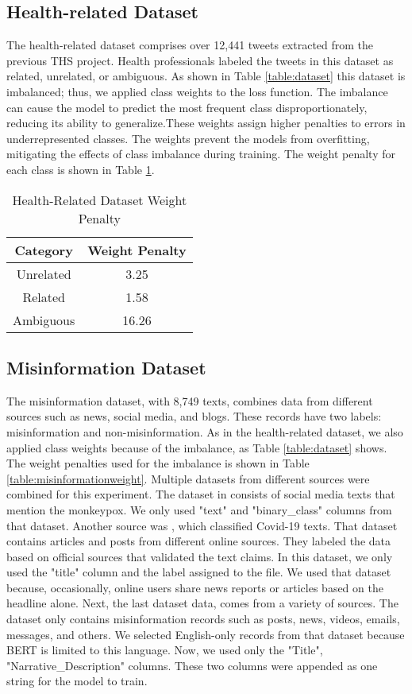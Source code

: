 \subsection{Health-related Dataset}
The health-related dataset comprises over 12,441 tweets extracted from the previous THS project.  Health professionals labeled the tweets in this dataset as related, unrelated, or ambiguous. As shown in Table \ref{table:dataset} this dataset is imbalanced; thus, we applied class weights to the loss function. The imbalance can cause the model to predict the most frequent class disproportionately, reducing its ability to generalize.These weights assign higher penalties to errors in underrepresented classes. The weights prevent the models from overfitting, mitigating the effects of class imbalance during training. The weight penalty for each class is shown in Table \ref{table:healthweight}.

\begin{table}[H]
	\centering
	\caption{Health-Related Dataset Weight Penalty}
	\begin{tabular}{||c | c||} 
			\hline
			\textbf{Category} & \textbf{Weight Penalty} \\ [1.5ex] 
			\hline
			Unrelated & 3.25 \\ [1ex]
			\hline
			Related & 1.58 \\[1ex]
			\hline
			Ambiguous & 16.26 \\[1ex]
			\hline
		\end{tabular}
	\label{table:healthweight}
\end{table}


\subsection{Misinformation Dataset}
The misinformation dataset, with 8,749 texts, combines data from different sources such as news, social media, and blogs. These records have two labels: misinformation and non-misinformation. As in the health-related dataset, we also applied class weights because of the imbalance, as Table \ref{table:dataset} shows. The weight penalties used for the imbalance is shown in Table \ref{table:misinformationweight}. Multiple datasets from different sources were combined for this experiment. The dataset in \cite{stephencrone2022} consists of social media texts that mention the monkeypox. We only used "text" and "binary\_class" columns from that dataset. Another source was \cite{coviddata}, which classified Covid-19 texts. That dataset contains articles and posts from different online sources. They labeled the data based on official sources that validated the text claims. In this dataset, we only used the "title" column and the label assigned to the file. We used that dataset because, occasionally, online users share news reports or articles based on the headline alone. Next, the last dataset \cite{covidunesco} data, comes from a variety of sources. The dataset only contains misinformation records such as posts, news, videos, emails, messages, and others. We selected English-only records from that dataset because BERT is limited to this language. Now, we used only the "Title", "Narrative\_Description" columns. These two columns were appended as one string for the model to train.


